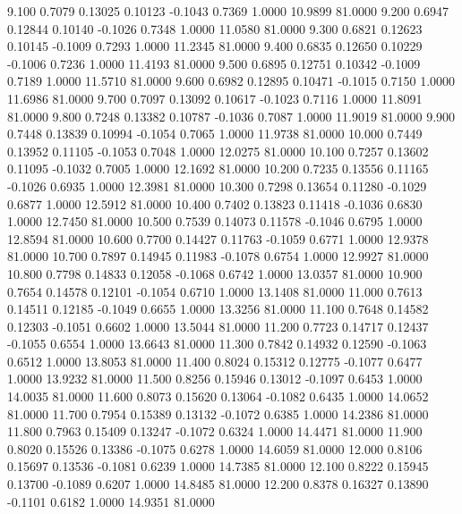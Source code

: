    9.100   0.7079   0.13025   0.10123  -0.1043   0.7369   1.0000  10.9899  81.0000
   9.200   0.6947   0.12844   0.10140  -0.1026   0.7348   1.0000  11.0580  81.0000
   9.300   0.6821   0.12623   0.10145  -0.1009   0.7293   1.0000  11.2345  81.0000
   9.400   0.6835   0.12650   0.10229  -0.1006   0.7236   1.0000  11.4193  81.0000
   9.500   0.6895   0.12751   0.10342  -0.1009   0.7189   1.0000  11.5710  81.0000
   9.600   0.6982   0.12895   0.10471  -0.1015   0.7150   1.0000  11.6986  81.0000
   9.700   0.7097   0.13092   0.10617  -0.1023   0.7116   1.0000  11.8091  81.0000
   9.800   0.7248   0.13382   0.10787  -0.1036   0.7087   1.0000  11.9019  81.0000
   9.900   0.7448   0.13839   0.10994  -0.1054   0.7065   1.0000  11.9738  81.0000
  10.000   0.7449   0.13952   0.11105  -0.1053   0.7048   1.0000  12.0275  81.0000
  10.100   0.7257   0.13602   0.11095  -0.1032   0.7005   1.0000  12.1692  81.0000
  10.200   0.7235   0.13556   0.11165  -0.1026   0.6935   1.0000  12.3981  81.0000
  10.300   0.7298   0.13654   0.11280  -0.1029   0.6877   1.0000  12.5912  81.0000
  10.400   0.7402   0.13823   0.11418  -0.1036   0.6830   1.0000  12.7450  81.0000
  10.500   0.7539   0.14073   0.11578  -0.1046   0.6795   1.0000  12.8594  81.0000
  10.600   0.7700   0.14427   0.11763  -0.1059   0.6771   1.0000  12.9378  81.0000
  10.700   0.7897   0.14945   0.11983  -0.1078   0.6754   1.0000  12.9927  81.0000
  10.800   0.7798   0.14833   0.12058  -0.1068   0.6742   1.0000  13.0357  81.0000
  10.900   0.7654   0.14578   0.12101  -0.1054   0.6710   1.0000  13.1408  81.0000
  11.000   0.7613   0.14511   0.12185  -0.1049   0.6655   1.0000  13.3256  81.0000
  11.100   0.7648   0.14582   0.12303  -0.1051   0.6602   1.0000  13.5044  81.0000
  11.200   0.7723   0.14717   0.12437  -0.1055   0.6554   1.0000  13.6643  81.0000
  11.300   0.7842   0.14932   0.12590  -0.1063   0.6512   1.0000  13.8053  81.0000
  11.400   0.8024   0.15312   0.12775  -0.1077   0.6477   1.0000  13.9232  81.0000
  11.500   0.8256   0.15946   0.13012  -0.1097   0.6453   1.0000  14.0035  81.0000
  11.600   0.8073   0.15620   0.13064  -0.1082   0.6435   1.0000  14.0652  81.0000
  11.700   0.7954   0.15389   0.13132  -0.1072   0.6385   1.0000  14.2386  81.0000
  11.800   0.7963   0.15409   0.13247  -0.1072   0.6324   1.0000  14.4471  81.0000
  11.900   0.8020   0.15526   0.13386  -0.1075   0.6278   1.0000  14.6059  81.0000
  12.000   0.8106   0.15697   0.13536  -0.1081   0.6239   1.0000  14.7385  81.0000
  12.100   0.8222   0.15945   0.13700  -0.1089   0.6207   1.0000  14.8485  81.0000
  12.200   0.8378   0.16327   0.13890  -0.1101   0.6182   1.0000  14.9351  81.0000
